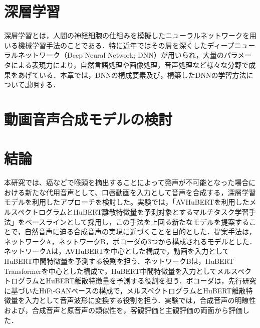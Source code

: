 \documentclass[12pt]{jarticle}
\numberwithin{equation}{section}    %
\numberwithin{figure}{section}      %
\numberwithin{table}{section}      %
\begin{document}
\clearpage

\setcounter{tocdepth}{3}
\tableofcontents
\thispagestyle{empty}
\clearpage

\pagestyle{plain}
\setcounter{page}{1}


\clearpage


\clearpage

\section{深層学習}
深層学習とは，人間の神経細胞の仕組みを模擬したニューラルネットワークを用いる機械学習手法のことである．特に近年ではその層を深くしたディープニューラルネットワーク（Deep Neural Network; DNN）が用いられ，大量のパラメータによる表現力により，自然言語処理や画像処理，音声処理など様々な分野で成果をあげている．本章では，DNNの構成要素及び，構築したDNNの学習方法について説明する．



\clearpage

\section{動画音声合成モデルの検討}





\clearpage

\section{結論}
本研究では、癌などで喉頭を摘出することによって発声が不可能となった場合における新たな代用音声として、口唇動画を入力として音声を合成する，深層学習モデルを利用したアプローチを検討した。実験では，「AVHuBERTを利用したメルスペクトログラムとHuBERT離散特徴量を予測対象とするマルチタスク学習手法」をベースラインとして採用し，この手法を上回る新たなモデルを提案することで，自然音声に迫る合成音声の実現に近づくことを目的とした．提案手法は，ネットワークA，ネットワークB，ボコーダの3つから構成されるモデルとした．ネットワークAは，AVHuBERTを中心とした構成で，動画を入力としてHuBERT中間特徴量を予測する役割を担う．ネットワークBは，HuBERT Transformerを中心とした構成で，HuBERT中間特徴量を入力としてメルスペクトログラムとHuBERT離散特徴量を予測する役割を担う．ボコーダは，先行研究に基づいたHiFi-GANベースの構成で，メルスペクトログラムとHuBERT離散特徴量を入力として音声波形に変換する役割を担う．実験では，合成音声の明瞭性および，合成音声と原音声の類似性を，客観評価と主観評価の両面から評価した．
\end{document}
